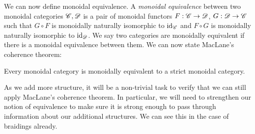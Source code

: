 We can now define monoidal equivalence. A \textit{monoidal equivalence} between two monoidal categories $\mathscr{C},\mathscr{D}$ is a pair of monoidal functors $F:\mathscr{C}\to \mathscr{D}$, $G:\mathscr{D}\to \mathscr{C}$ such that $G\circ F$ is monoidally naturally isomorphic to $\operatorname{id}_{\mathscr{C}}$ and $F\circ G$ is monoidally naturally isomorphic to $\operatorname{id}_{\mathscr{D}}$. We say two categories are monoidally equivalent if there is a monoidal equivalence between them. We can now state MacLane's coherence theorem:

\begin{theorem} Every monoidal category is monoidally equivalent to a strict monoidal category.
\end{theorem}

As we add more structure, it will be a non-trivial task to verify that we can still apply MacLane's coherence theorem. In particular, we will need to strengthen our notion of equivalence to make sure it is strong enough to pass through information about our additional structures. We can see this in the case of braidings already.

